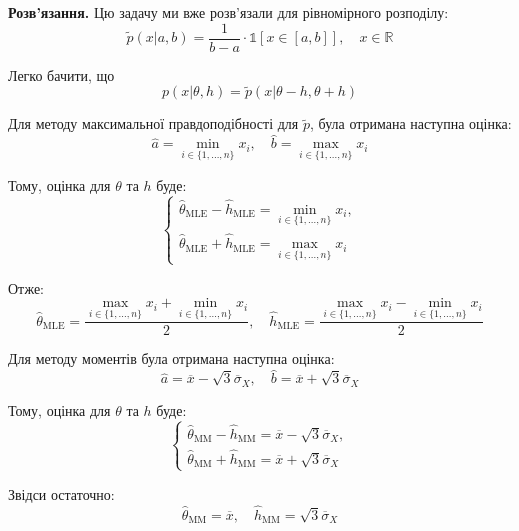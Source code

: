 \documentclass{hw_template}
\begin{document}
\textbf{Розв'язання.} Цю задачу ми вже розв'язали для рівномірного розподілу:
\begin{equation*}
    \widetilde{p}(x|a,b) = \frac{1}{b-a} \cdot \mathds{1}[x \in [a,b]], \quad x \in \mathbb{R}
\end{equation*}

Легко бачити, що
\begin{equation*}
    p(x|\theta,h) = \widetilde{p}(x|\theta-h,\theta+h)
\end{equation*}

Для методу максимальної правдоподібності для $\widetilde{p}$, була отримана наступна оцінка:
\begin{equation*}
    \hat{a} = \min_{i \in \{1,\dots,n\}}x_i, \quad \hat{b} = \max_{i \in \{1,\dots,n\}}x_i
\end{equation*}

Тому, оцінка для $\theta$ та $h$ буде:
\begin{equation*}
    \begin{cases}
        \hat{\theta}_{\text{MLE}} - \hat{h}_{\text{MLE}} = \min_{i \in \{1,\dots,n\}}x_i, \\
        \hat{\theta}_{\text{MLE}} + \hat{h}_{\text{MLE}} = \max_{i \in \{1,\dots,n\}}x_i
    \end{cases}
\end{equation*}

Отже:
\begin{equation*}
    \boxed{\hat{\theta}_{\text{MLE}} = \frac{\max_{i \in \{1,\dots,n\}}x_i+\min_{i \in \{1,\dots,n\}}x_i}{2}, \quad \hat{h}_{\text{MLE}} = \frac{\max_{i \in \{1,\dots,n\}}x_i-\min_{i \in \{1,\dots,n\}}x_i}{2}}
\end{equation*}

Для методу моментів була отримана наступна оцінка:
\begin{equation*}
    \hat{a} = \overline{x} - \sqrt{3}\overline{\sigma}_X, \quad \hat{b} = \overline{x} + \sqrt{3}\overline{\sigma}_X
\end{equation*}

Тому, оцінка для $\theta$ та $h$ буде:
\begin{equation*}
    \begin{cases}
        \hat{\theta}_{\text{MM}} - \hat{h}_{\text{MM}} = \overline{x} - \sqrt{3}\overline{\sigma}_X, \\
        \hat{\theta}_{\text{MM}} + \hat{h}_{\text{MM}} = \overline{x} + \sqrt{3}\overline{\sigma}_X
    \end{cases}
\end{equation*}

Звідси остаточно:
\begin{equation*}
    \boxed{\hat{\theta}_{\text{MM}} = \overline{x}, \quad \hat{h}_{\text{MM}} = \sqrt{3}\overline{\sigma}_X}
\end{equation*}
\end{document}
